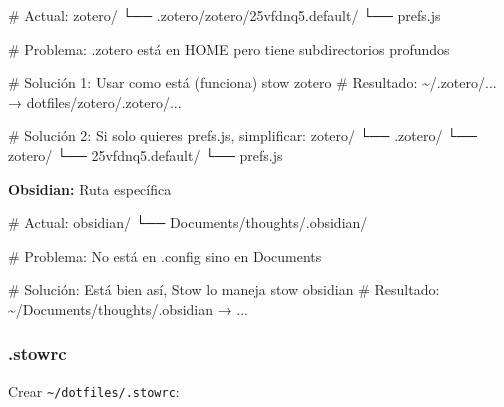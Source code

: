 \documentclass[
  doc,
  floatsintext,
  longtable,
  a4paper,
  nolmodern,
  notxfonts,
  notimes,
  12pt,
  colorlinks=true,linkcolor=blue,citecolor=blue,urlcolor=blue]{apa7}
\newenvironment{Shaded}{\begin{snugshade}}{\end{snugshade}}
\newcommand{\CommentTok}[1]{\textcolor[rgb]{0.37,0.37,0.37}{#1}}
\newcommand{\ExtensionTok}[1]{\textcolor[rgb]{0.00,0.23,0.31}{#1}}
\newcommand{\NormalTok}[1]{\textcolor[rgb]{0.00,0.23,0.31}{#1}}
\begin{document}
\begin{Shaded}
\begin{Highlighting}[]
\CommentTok{\# Actual:}
\ExtensionTok{zotero/}
  \ExtensionTok{└──}\NormalTok{ .zotero/zotero/25vfdnq5.default/}
      \ExtensionTok{└──}\NormalTok{ prefs.js}

\CommentTok{\# Problema: .zotero está en HOME pero tiene subdirectorios profundos}

\CommentTok{\# Solución 1: Usar como está (funciona)}
\ExtensionTok{stow}\NormalTok{ zotero}
\CommentTok{\# Resultado: \textasciitilde{}/.zotero/... → dotfiles/zotero/.zotero/...}

\CommentTok{\# Solución 2: Si solo quieres prefs.js, simplificar:}
\ExtensionTok{zotero/}
  \ExtensionTok{└──}\NormalTok{ .zotero/}
      \ExtensionTok{└──}\NormalTok{ zotero/}
          \ExtensionTok{└──}\NormalTok{ 25vfdnq5.default/}
              \ExtensionTok{└──}\NormalTok{ prefs.js}
\end{Highlighting}
\end{Shaded}

\textbf{Obsidian:} Ruta específica

\begin{Shaded}
\begin{Highlighting}[]
\CommentTok{\# Actual:}
\ExtensionTok{obsidian/}
  \ExtensionTok{└──}\NormalTok{ Documents/thoughts/.obsidian/}

\CommentTok{\# Problema: No está en .config sino en Documents}

\CommentTok{\# Solución: Está bien así, Stow lo maneja}
\ExtensionTok{stow}\NormalTok{ obsidian}
\CommentTok{\# Resultado: \textasciitilde{}/Documents/thoughts/.obsidian → ...}
\end{Highlighting}
\end{Shaded}

\subsubsection{.stowrc}\label{stowrc}

Crear \texttt{\textasciitilde{}/dotfiles/.stowrc}:
\end{document}
